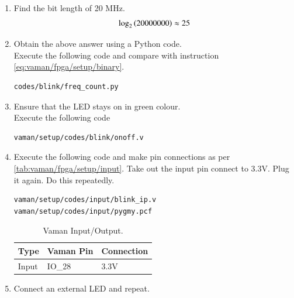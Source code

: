 \begin{enumerate}[label=\arabic*.,ref=\theenumi]
\item Find the bit length of 20 MHz.
\\
\solution 
\begin{align}
\log_2\left(20000000\right) \approx 25
\end{align}
\item Obtain the above answer using a Python code.
\\
\solution Execute the following code and compare with instruction  \ref{eq:vaman/fpga/setup/binary}.
\begin{lstlisting}
codes/blink/freq_count.py
\end{lstlisting}
\item Ensure that the LED stays on in green colour.
	\\
\solution  Execute the following code
\begin{lstlisting}
vaman/setup/codes/blink/onoff.v
\end{lstlisting}
\item Execute the following code and make pin connections as per
\autoref{tab:vaman/fpga/setup/input}.
	Take out the input pin connect to 3.3V. Plug it again.
Do this repeatedly.
\begin{lstlisting}
vaman/setup/codes/input/blink_ip.v
vaman/setup/codes/input/pygmy.pcf
\end{lstlisting}
\begin{table}[]
\centering
\begin{tabular}{|l|l|l|}
\hline
Type & Vaman Pin  &  Connection \\ \hline
Input &  IO\_28 &  3.3V \\ \hline
\end{tabular}
\caption{Vaman Input/Output.}
\label{tab:vaman/fpga/setup/input}
\end{table}
\item Connect an external LED and repeat.
%
\begin{figure}[!ht]
\centering

\end{figure}
\end{enumerate}
